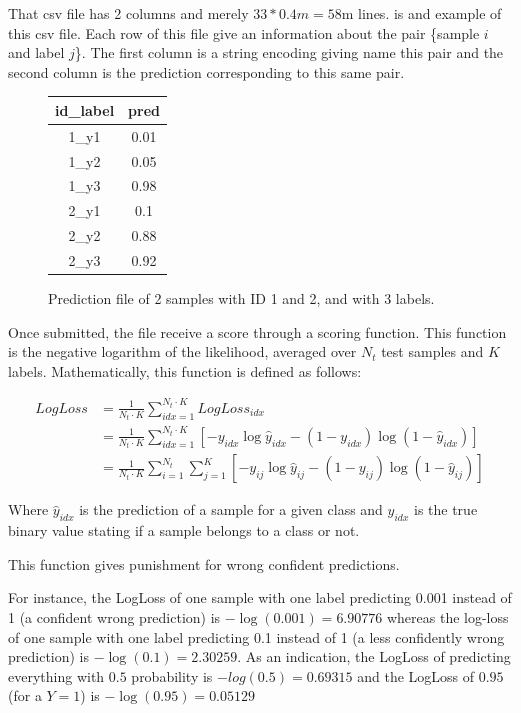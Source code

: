		That csv file has 2 columns and merely $33*0.4m=58$m lines.  is and example of this csv file. Each row of this file give an information about the pair \{sample $i$ and label $j$\}. The first column is a string encoding giving name this pair and the second column is the prediction corresponding to this same pair.

		\begin{figure}
			\centering
			\begin{tabular}{cc}
				id\_label & pred\\
				\hline

				1\_y1 & 0.01 \\
				1\_y2 & 0.05 \\
				1\_y3 & 0.98 \\
				2\_y1 & 0.1  \\
				2\_y2 & 0.88 \\
				2\_y3 & 0.92 \\

			\end{tabular}
			\caption{Prediction file of 2 samples with ID 1 and 2, and with 3 labels.}
			\label{fig:sample_prediction}
		\end{figure}


		Once submitted, the file receive a score through a scoring function. This function is the negative logarithm of the likelihood, averaged over $N_t$ test samples and $K$ labels.
		Mathematically, this function is defined as follows:

		\begin{equation} \label{eq1}
			\begin{split}
				LogLoss & = \frac{1}{N_t \cdot K} \sum_{idx=1}^{N_t \cdot K} LogLoss_{idx} \\
				&= \frac{1}{N_t \cdot K} \sum_{idx=1}^{N_t \cdot K} [-y_{idx} \log{\hat{y}_{idx}} - (1-y_{idx}) \log{(1-\hat{y}_{idx}) }] \\
		        &= \frac{1}{N_t \cdot K} \sum_{i=1}^{N_t} \sum_{j=1}^{K} [-y_{ij} \log{\hat{y}_{ij}} - (1-y_{ij}) \log{(1-\hat{y}_{ij}) }]
			\end{split}
		\end{equation}

		Where $\hat{y}_{idx}$ is the prediction of a sample for a given class and $y_{idx}$ is the true binary value stating if a sample belongs to a class or not.

		This function gives punishment for wrong confident predictions. 

		For instance, the LogLoss of one sample with one label predicting 0.001 instead of 1 (a confident wrong prediction) is $-\log(0.001) = 6.90776 $ whereas the log-loss of one sample with one label predicting 0.1 instead of 1 (a less confidently wrong prediction) is $-\log(0.1) = 2.30259$. As an indication, the LogLoss of predicting everything with $0.5$ probability is $-log(0.5) = 0.69315$ and the LogLoss of $0.95$ (for a $Y=1$) is $-\log(0.95) = 0.05129$



